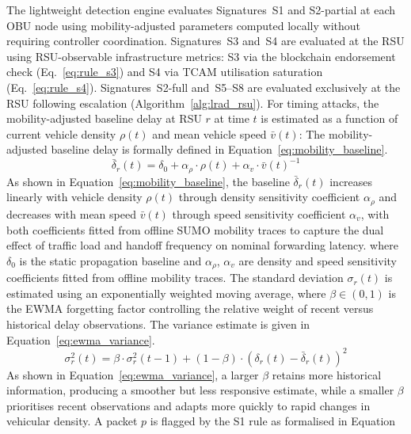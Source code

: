 \documentclass[12pt, a4paper]{report}
\begin{document}
The lightweight detection engine evaluates Signatures~S1
and S2-partial at each \ac{OBU} node using
mobility-adjusted parameters computed locally without
requiring controller coordination. Signatures~S3 and~S4
are evaluated at the \ac{RSU} using \ac{RSU}-observable
infrastructure metrics: S3 via the blockchain endorsement
check (Eq.~\ref{eq:rule_s3}) and S4 via \ac{TCAM}
utilisation saturation (Eq.~\ref{eq:rule_s4}). Signatures~S2-full
and~S5--S8 are evaluated exclusively at the \ac{RSU}
following escalation (Algorithm~\ref{alg:lrad_rsu}). For timing attacks, the
mobility-adjusted baseline delay at RSU $r$ at time $t$ is estimated
as a function of current vehicle density $\rho(t)$ and mean vehicle
speed $\bar{v}(t)$:
The mobility-adjusted baseline delay is formally defined in
Equation~\eqref{eq:mobility_baseline}.
\begin{equation}
\bar{\delta}_r(t) = \delta_0 + \alpha_\rho \cdot \rho(t) + \alpha_v \cdot \bar{v}(t)^{-1}
\label{eq:mobility_baseline}
\end{equation}
As shown in Equation~\eqref{eq:mobility_baseline}, the baseline
$\bar{\delta}_r(t)$ increases linearly with vehicle density $\rho(t)$
through density sensitivity coefficient $\alpha_\rho$ and decreases with mean speed
$\bar{v}(t)$ through speed sensitivity coefficient $\alpha_v$, with both coefficients
fitted from offline SUMO mobility traces to capture the dual effect of
traffic load and handoff frequency on nominal forwarding latency.
where $\delta_0$ is the static propagation baseline and $\alpha_\rho$,
$\alpha_v$ are density and speed sensitivity coefficients fitted from
offline mobility traces. The standard deviation $\sigma_r(t)$ is
estimated using an exponentially weighted moving average,
where $\beta \in (0,1)$ is the EWMA forgetting factor controlling
the relative weight of recent versus historical delay observations.
The variance estimate is given in Equation~\eqref{eq:ewma_variance}.
\begin{equation}
\sigma_r^2(t) = \beta \cdot \sigma_r^2(t-1)
+ (1-\beta)\cdot\left(\delta_r(t) - \bar{\delta}_r(t)\right)^2
\label{eq:ewma_variance}
\end{equation}
As shown in Equation~\eqref{eq:ewma_variance}, a larger $\beta$
retains more historical information, producing a smoother but less
responsive estimate, while a smaller $\beta$ prioritises recent
observations and adapts more quickly to rapid changes in vehicular
density.
A packet $p$ is flagged by the S1 rule as formalised in
Equation
\end{document}
